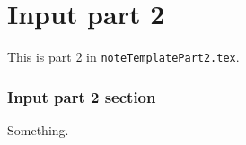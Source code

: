 \documentclass[english, nochinese]{note}
\begin{document}
\part{Input part 2}

This is part 2 in \verb"noteTemplatePart2.tex".

\section{Input part 2 section}

Something.
\end{document}

